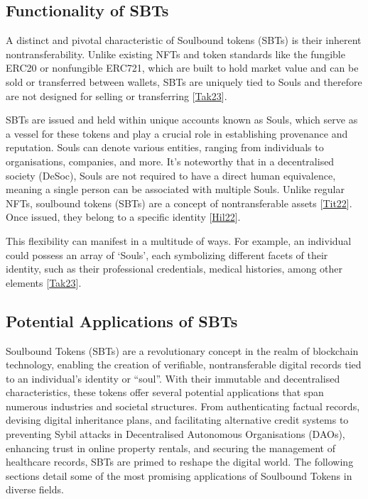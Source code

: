 \documentclass[letterpaper,10pt,english]{jupyterBook}
\begin{document}
\subsection{Functionality of SBTs}
\label{\detokenize{SBT/SBT:functionality-of-sbts}}
\sphinxAtStartPar
A distinct and pivotal characteristic of Soulbound tokens (SBTs) is their inherent non\sphinxhyphen{}transferability. Unlike existing NFTs and token standards like the fungible ERC\sphinxhyphen{}20 or non\sphinxhyphen{}fungible ERC\sphinxhyphen{}721, which are built to hold market value and can be sold or transferred between wallets, SBTs are uniquely tied to Souls and therefore are not designed for selling or transferring {[}\hyperlink{cite.SBT/SBT:id90}{Tak23}{]}.

\sphinxAtStartPar
SBTs are issued and held within unique accounts known as Souls, which serve as a vessel for these tokens and play a crucial role in establishing provenance and reputation. Souls can denote various entities, ranging from individuals to organisations, companies, and more. It’s noteworthy that in a decentralised society (DeSoc), Souls are not required to have a direct human equivalence, meaning a single person can be associated with multiple Souls. Unlike regular NFTs, soulbound tokens (SBTs) are a concept of non\sphinxhyphen{}transferable assets {[}\hyperlink{cite.SBT/SBT:id91}{Tit22}{]}. Once issued, they belong to a specific identity {[}\hyperlink{cite.SBT/SBT:id82}{Hil22}{]}.

\sphinxAtStartPar
This flexibility can manifest in a multitude of ways. For example, an individual could possess an array of ‘Souls’, each symbolizing different facets of their identity, such as their professional credentials, medical histories, among other elements {[}\hyperlink{cite.SBT/SBT:id90}{Tak23}{]}.


\subsection{Potential Applications of SBTs}
\label{\detokenize{SBT/SBT:potential-applications-of-sbts}}
\sphinxAtStartPar
Soulbound Tokens (SBTs) are a revolutionary concept in the realm of blockchain technology, enabling the creation of verifiable, non\sphinxhyphen{}transferable digital records tied to an individual’s identity or “soul”. With their immutable and decentralised characteristics, these tokens offer several potential applications that span numerous industries and societal structures. From authenticating factual records, devising digital inheritance plans, and facilitating alternative credit systems to preventing Sybil attacks in Decentralised Autonomous Organisations (DAOs), enhancing trust in online property rentals, and securing the management of healthcare records, SBTs are primed to reshape the digital world. The following sections detail some of the most promising applications of Soulbound Tokens in diverse fields.
\end{document}
